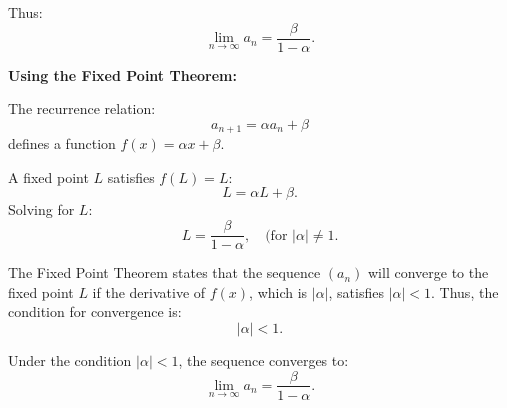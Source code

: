 \documentclass[12pt]{article}
\begin{document}
\begin{enumerate}
Thus:
\[
\lim_{n \to \infty} a_n = \frac{\beta}{1 - \alpha}.
\]

\textbf{Using the Fixed Point Theorem:}

The recurrence relation:
\[
a_{n+1} = \alpha a_n + \beta
\]
defines a function \(f(x) = \alpha x + \beta\).

A fixed point \(L\) satisfies \(f(L) = L\):
\[
L = \alpha L + \beta.
\]
Solving for \(L\):
\[
L = \frac{\beta}{1 - \alpha}, \quad \text{(for \(|\alpha| \neq 1\)}.
\]

The Fixed Point Theorem states that the sequence \((a_n)\) will converge to the fixed point \(L\) if the derivative of \(f(x)\), which is \(|\alpha|\), satisfies \(|\alpha| < 1\). Thus, the condition for convergence is:
\[
|\alpha| < 1.
\]

Under the condition \(|\alpha| < 1\), the sequence converges to:
\[
\lim_{n \to \infty} a_n = \frac{\beta}{1 - \alpha}.
\]



\end{enumerate}
\end{document}
